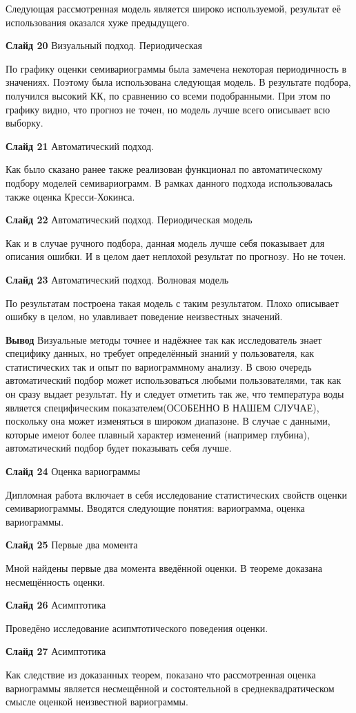 \documentclass[a4paper,10pt]{report}
\begin{document}
Следующая рассмотренная модель является широко используемой, результат её использования оказался хуже предыдущего.

\textbf{Слайд 20} Визуальный подход. Периодическая

По графику оценки семивариограммы была замечена некоторая периодичность в значениях. Поэтому была использована следующая модель. В результате подбора, получился высокий КК, по сравнению со всеми подобранными. При этом по графику видно, что прогноз не точен, но модель лучше всего описывает всю выборку.

\textbf{Слайд 21} Автоматический подход.

Как было сказано ранее также реализован функционал по автоматическому подбору моделей семивариограмм. В рамках данного подхода использовалась также оценка Кресси-Хокинса.

\textbf{Слайд 22} Автоматический подход. Периодическая модель

Как и в случае ручного подбора, данная модель лучше себя показывает для описания ошибки. И в целом дает неплохой результат по прогнозу. Но не точен.

\textbf{Слайд 23} Автоматический подход. Волновая модель

По результатам построена такая модель с таким результатом. Плохо описывает ошибку в целом, но улавливает поведение неизвестных значений.

\textbf{Вывод} Визуальные методы точнее и надёжнее так как исследователь знает специфику данных, но требует определённый знаний у пользователя, как статистических так и опыт по вариограммному анализу. В свою очередь автоматический подбор может использоваться любыми пользователями, так как он сразу выдает результат. Ну и следует отметить так же, что температура воды является специфическим показателем(ОСОБЕННО В НАШЕМ СЛУЧАЕ), поскольку она может изменяться в широком диапазоне. В случае с данными, которые имеют более плавный характер изменений (например глубина), автоматический подбор будет показывать себя лучше.

\textbf{Слайд 24} Оценка вариограммы

Дипломная работа включает в себя исследование статистических свойств оценки семивариограммы. Вводятся следующие понятия: вариограмма, оценка вариограммы.

\textbf{Слайд 25} Первые два момента

Мной найдены первые два момента введённой оценки. В теореме доказана несмещённость оценки.

\textbf{Слайд 26} Асимптотика

Проведёно исследование асипмтотического поведения оценки.

\textbf{Слайд 27} Асимптотика

Как следствие из доказанных теорем, показано что рассмотренная оценка вариограммы является несмещённой и состоятельной в среднеквадратическом смысле оценкой неизвестной вариограммы.
\end{document}
